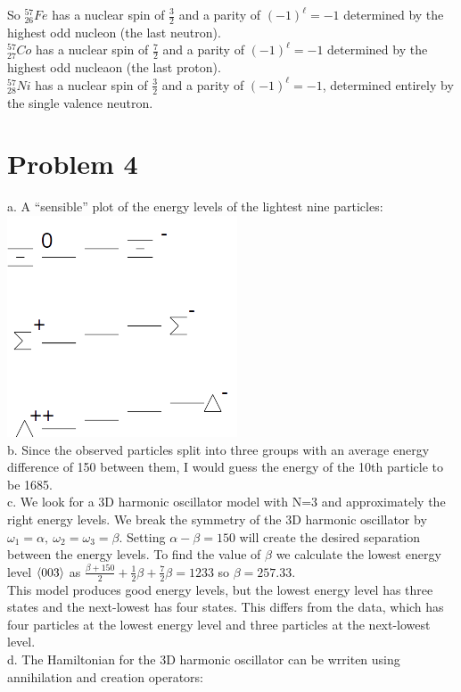 \documentclass[a4paper,12pt]{article}
\numberwithin{equation}{section}
\begin{document}
So $^{57}_{26}Fe$ has a nuclear spin of $\frac{3}{2}$ and a parity of $(-1)^\ell=-1$ determined by the highest odd nucleon (the last neutron).\\
$^{57}_{27}Co$ has a nuclear spin of $\frac{7}{2}$ and a parity of $(-1)^\ell=-1$ determined by the highest odd nucleaon (the last proton).\\
$^{57}_{28}Ni$  has a nuclear spin of $\frac{3}{2}$ and a parity of $(-1)^\ell=-1$, determined entirely by the single valence neutron.

\section{Problem 4}
a. A ``sensible'' plot of the energy levels of the lightest nine particles: \\
\includegraphics{p4}
\\
b. Since the observed particles split into three groups with an average energy difference of 150 between them, I would guess the energy of the 10th particle to be 1685.\\
c. We look for a 3D harmonic oscillator model with N=3 and approximately the right energy levels. 
We break the symmetry of the 3D harmonic oscillator by $\omega_1=\alpha,\ \omega_2=\omega_3=\beta$.
Setting $\alpha-\beta=150$ will create the desired separation between the energy levels.
To find the value of $\beta$ we calculate the lowest energy level $\braket{0 0 3}$ as $\frac{\beta+150}{2}+ \frac{1}{2}\beta + \frac{7}{2}\beta=1233$ so $\beta=257.33$.\\
This model produces good energy levels, but the lowest energy level has three states and the next-lowest has four states.
This differs from the data, which has four particles at the lowest energy level and three particles at the next-lowest level.\\
d. The Hamiltonian for the 3D harmonic oscillator can be wrriten using annihilation and creation operators:
\end{document}
